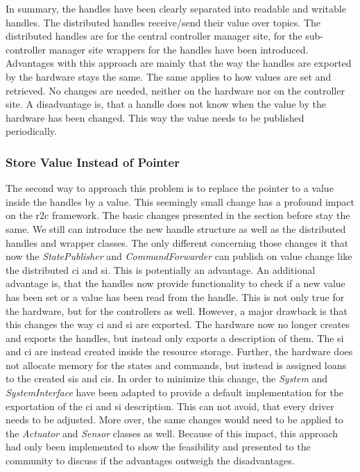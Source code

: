 In summary, the \glspl{handle} have been clearly separated into readable and writable \glspl{handle}. The distributed \glspl{handle} receive/send their value over topics. The distributed \glspl{handle} are for the central controller manager site, for the sub-controller manager site wrappers for the handles have been introduced.\newline 
Advantages with this approach are mainly that the way the \glspl{handle} are exported by the hardware stays the same. The same applies to how values are set and retrieved. No changes are needed, neither on the hardware nor on the controller site.\newline
A disadvantage is, that a \gls{handle} does not know when the value by the hardware has been changed. This way the value needs to be published periodically.

\subsubsection*{Store Value Instead of Pointer} 
The second way to approach this problem is to replace the pointer to a value inside the \glspl{handle} by a value. This seemingly small change has a profound impact on the \gls{r2c} framework. The basic changes presented in the section before stay the same. We still can introduce the new \gls{handle} structure as well as the distributed \glspl{handle} and wrapper classes. The only different concerning those changes it that now the \textit{StatePublisher} and \textit{CommandForwarder} can publish on value change like the distributed \gls{ci} and \gls{si}. This is potentially an advantage. An additional advantage is, that the \glspl{handle} now provide functionality to check if a new value has been set or a value has been read from the handle. This is not only true for the hardware, but for the controllers as well. \newline
However, a major drawback is that this changes the way \gls{ci} and \gls{si} are exported. The hardware now no longer creates and exports the \glspl{handle}, but instead only exports a description of them. The \gls{si} and \gls{ci} are instead created inside the resource storage. Further, the hardware does not allocate memory for the states and commands, but instead is assigned loans to the created \glspl{si} and \glspl{ci}. In order to minimize this change, the \textit{System} and \textit{SystemInterface} have been adapted to provide a default implementation for the exportation of the \gls{ci} and \gls{si} description. This can not avoid, that every driver needs to be adjusted. More over, the same changes would need to be applied to the \textit{Actuator} and \textit{Sensor} classes as well. Because of this impact, this approach had only been implemented to show the feasibility and presented to the community to discuss if the advantages outweigh the disadvantages. 

